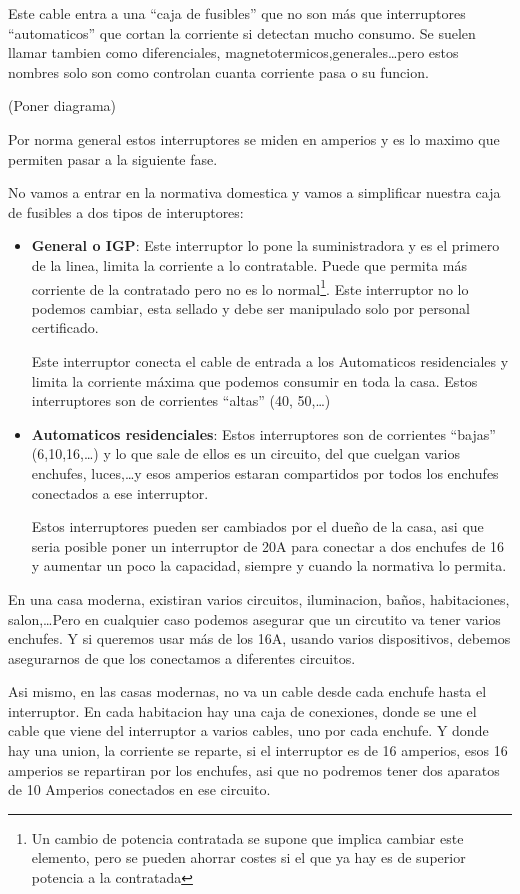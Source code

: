 Este cable entra a una ``caja de fusibles'' que no son más que interruptores ``automaticos'' que cortan la corriente si detectan mucho consumo.
Se suelen llamar tambien como diferenciales, magnetotermicos,generales\dots pero estos nombres solo son como controlan cuanta corriente pasa o su funcion.

(Poner diagrama)

Por norma general estos interruptores se miden en amperios y es lo maximo que permiten pasar a la siguiente fase.

No vamos a entrar en la normativa domestica y vamos a simplificar nuestra caja de fusibles a dos tipos de interuptores:
\begin{itemize}
\item \textbf{General o IGP}: Este interruptor lo pone la suministradora y es el primero de la linea, limita la corriente a lo contratable. Puede que permita más corriente de la contratado pero no es lo normal\footnote{Un cambio de potencia contratada se supone que implica cambiar este elemento, pero se pueden ahorrar costes si el que ya hay es de superior potencia a la contratada}. Este interruptor no lo podemos cambiar, esta sellado y debe ser manipulado solo por personal certificado. 

Este interruptor conecta el cable de entrada a los Automaticos residenciales y limita la corriente máxima que podemos consumir en toda la casa. Estos interruptores son de corrientes ``altas'' (40, 50,\dots)
\item \textbf{Automaticos residenciales}: Estos interruptores son de corrientes ``bajas'' (6,10,16,\dots) y lo que sale de ellos es un circuito, del que cuelgan varios enchufes, luces,\dots y esos amperios estaran compartidos por todos los enchufes conectados a ese interruptor.

Estos interruptores pueden ser cambiados por el dueño de la casa, asi que seria posible poner un interruptor de 20A para conectar a dos enchufes de 16 y aumentar un poco la capacidad, siempre y cuando la normativa lo permita.
\end{itemize}

En una casa moderna, existiran varios circuitos, iluminacion, baños, habitaciones, salon,\dots Pero en cualquier caso podemos asegurar que un circutito va tener varios enchufes. Y si queremos usar más de los 16A, usando varios dispositivos, debemos asegurarnos de que los conectamos a diferentes circuitos.

Asi mismo, en las casas modernas, no va un cable desde cada enchufe hasta el interruptor. En cada habitacion hay una caja de conexiones, donde se une el cable que viene del interruptor a varios cables, uno por cada enchufe. Y donde hay una union, la corriente se reparte, si el interruptor es de 16 amperios, esos 16 amperios se repartiran por los enchufes, asi que no podremos tener dos aparatos de 10 Amperios conectados en ese circuito.

